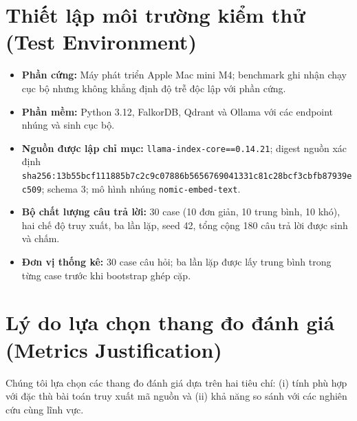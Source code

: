 \documentclass[12pt,a4paper,oneside]{report}
\begin{document}
\section{Thiết lập môi trường kiểm thử (Test Environment)}
\begin{itemize}
    \item \textbf{Phần cứng:} Máy phát triển Apple Mac mini M4; benchmark ghi nhận chạy cục bộ nhưng không khẳng định độ trễ độc lập với phần cứng.
    \item \textbf{Phần mềm:} Python 3.12, FalkorDB, Qdrant và Ollama với các endpoint nhúng và sinh cục bộ.
    \item \textbf{Nguồn được lập chỉ mục:} \texttt{llama-index-core==0.14.21}; digest nguồn xác định \texttt{sha256:13b55bcf111885b7c2c9c07886b5656769041331c81c28bcf3cbfb87939ec509}; schema 3; mô hình nhúng \texttt{nomic-embed-text}.
    \item \textbf{Bộ chất lượng câu trả lời:} 30 case (10 đơn giản, 10 trung bình, 10 khó), hai chế độ truy xuất, ba lần lặp, seed 42, tổng cộng 180 câu trả lời được sinh và chấm.
    \item \textbf{Đơn vị thống kê:} 30 case câu hỏi; ba lần lặp được lấy trung bình trong từng case trước khi bootstrap ghép cặp.
\end{itemize}

\section{Lý do lựa chọn thang đo đánh giá (Metrics Justification)}
\label{sec:metrics_justification}
Chúng tôi lựa chọn các thang đo đánh giá dựa trên hai tiêu chí: (i) tính phù hợp với đặc thù bài toán truy xuất mã nguồn và (ii) khả năng so sánh với các nghiên cứu cùng lĩnh vực.
\end{document}
